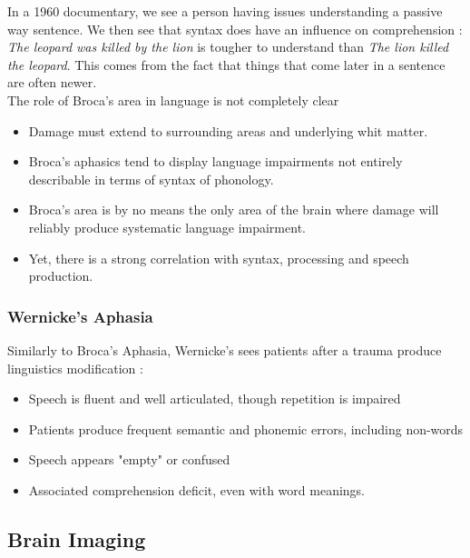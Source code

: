 \documentclass{cours}
\begin{document}
In a 1960 documentary, we see a person having issues understanding a passive way sentence. We then see that syntax does have an influence on comprehension : \textsl{The leopard was killed by the lion} is tougher to understand than \textsl{The lion killed the leopard}. This comes from the fact that things that come later in a sentence are often newer. \\
The role of Broca's area in language is not completely clear
\begin{itemize}
    \item Damage must extend to surrounding areas and underlying whit matter.
    \item Broca's aphasics tend to display language impairments not entirely describable in terms of syntax of phonology.
    \item Broca's area is by no means the only area of the brain where damage will reliably produce systematic language impairment.
    \item Yet, there is a strong correlation with syntax, processing and speech production.
\end{itemize}

\subsubsection{Wernicke's Aphasia}
Similarly to Broca's Aphasia, Wernicke's sees patients after a trauma produce linguistics modification :
\begin{itemize}
    \item Speech is fluent and well articulated, though repetition is impaired
    \item Patients produce frequent semantic and phonemic errors, including non-words
    \item Speech appears "empty" or confused
    \item Associated comprehension deficit, even with word meanings.
\end{itemize}

\subsection{Brain Imaging}
\end{document}
